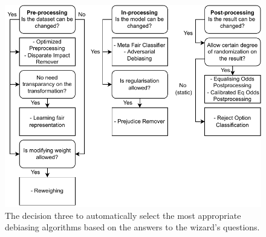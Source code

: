 \documentclass[sigconf,review]{acmart}
\begin{document}
\begin{figure}
	\includegraphics[width=\linewidth]{figures/wizard-debiasing}
	\caption{The decision three to automatically select the most appropriate debiasing algorithms based on the answers to the wizard's questions.}
	\label{fig:wizard-debiasing}
\end{figure}
\end{document}

